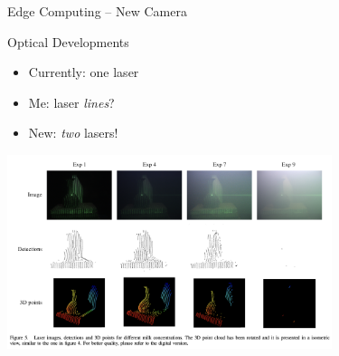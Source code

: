 \begin{frame}{Edge Computing – New Camera}
\begin{minipage}[t]{0.32\textwidth}
    \end{minipage}
\end{frame}

\begin{frame}{Optical Developments}
    \centering
    \begin{itemize}
        \item Currently: one laser
        \item Me: laser \textit{lines}?
        \item New: \textit{two} lasers!
    \end{itemize}
    \includegraphics[height=0.6\textheight, width=0.7125\textwidth, keepaspectratio]{images/laser_line_examples.png}
\end{frame}
